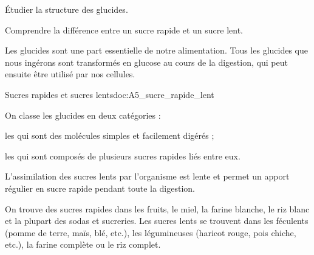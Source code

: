 \tetePremStssStru


\begin{objectifs}
  \item Étudier la structure des glucides.
  \item Comprendre la différence entre un sucre rapide et un sucre lent.
\end{objectifs}

\begin{contexte}
  Les glucides sont une part essentielle de notre alimentation.
  Tous les glucides que nous ingérons sont transformés en glucose au cours de la digestion,
  qui peut ensuite être utilisé par nos cellules.

\end{contexte}



\begin{doc}{Sucres rapides et sucres lents}{doc:A5_sucre_rapide_lent}
  \begin{encart}
    On classe les glucides en deux catégories :
    \begin{listePoints}
      \item les  qui sont des molécules simples et facilement digérés ;
      \item les  qui sont composés de plusieurs sucres rapides liés entre eux.  
    \end{listePoints}
    L'assimilation des sucres lents par l'organisme est lente et permet un apport régulier en sucre rapide pendant toute la digestion.
  \end{encart}

  On trouve des sucres rapides dans les fruits, le miel, la farine blanche, le riz blanc et la plupart des sodas et sucreries.
  Les sucres lents se trouvent dans les féculents (pomme de terre, maïs, blé, etc.), les légumineuses (haricot rouge, pois chiche, etc.), la farine complète ou le riz complet.
\end{doc}

